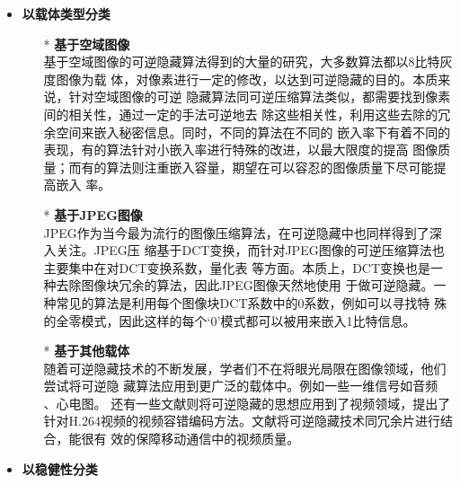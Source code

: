 \vspace{-8mm}
\begin{itemize}
  \vspace{-2.5mm}
  \item \textbf{以载体类型分类}\\
  \vspace{-9mm}
  \begin{itemize}
    \item[*] \textbf{基于空域图像}\\
    基于空域图像的可逆隐藏算法得到的大量的研究，大多数算法都以8比特灰度图像为载
    体，对像素进行一定的修改，以达到可逆隐藏的目的。本质来说，针对空域图像的可逆
    隐藏算法同可逆压缩算法类似，都需要找到像素间的相关性，通过一定的手法可逆地去
    除这些相关性，利用这些去除的冗余空间来嵌入秘密信息。同时，不同的算法在不同的
    嵌入率下有着不同的表现，有的算法针对小嵌入率进行特殊的改进，以最大限度的提高
    图像质量；而有的算法则注重嵌入容量，期望在可以容忍的图像质量下尽可能提高嵌入
    率。
    \par
    \vspace{-2.5mm}
    \item[*] \textbf{基于JPEG图像}\\
    JPEG作为当今最为流行的图像压缩算法，在可逆隐藏中也同样得到了深入关注。JPEG压
    缩基于DCT变换，而针对JPEG图像的可逆压缩算法也主要集中在对DCT变换系数，量化表
    等方面。本质上，DCT变换也是一种去除图像块冗余的算法，因此JPEG图像天然地使用
    于做可逆隐藏。一种常见的算法是利用每个图像块DCT系数中的0系数，例如可以寻找特
    殊的全零模式，因此这样的每个‘0’模式都可以被用来嵌入1比特信息。
    \par
    \vspace{-2.5mm}
    \item[*] \textbf{基于其他载体}\\
    随着可逆隐藏技术的不断发展，学者们不在将眼光局限在图像领域，他们尝试将可逆隐
    藏算法应用到更广泛的载体中。例如一些一维信号如音频\cite{shiu2014reversible}
    \cite{chen2013reversible}、心电图\cite{ibaida2013wavelet}\cite{rubio2013secure}。
    还有一些文献则将可逆隐藏的思想应用到了视频领域\cite{xu2014improved}，提出了
    针对H.264视频的视频容错编码方法。文献将可逆隐藏技术同冗余片进行结合，能很有
    效的保障移动通信中的视频质量。\\
  \end{itemize}
  \vspace{-12mm}
  \item \textbf{以稳健性分类}\\
  \vspace{-9mm}

\end{itemize}
